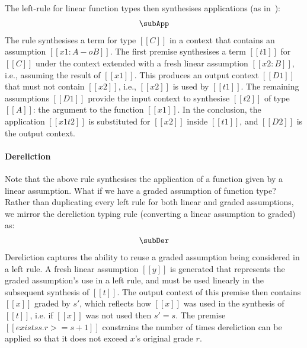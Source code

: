 The left-rule for linear function types then synthesises applications
(as in~\cite{HODAS1994327}):
%
  \begin{align*}
    \subApp
    \end{align*}
%
  The rule synthesises a term for type $[[ C ]]$ in a context that
  contains an assumption $[[ x1 : A -o B ]]$.
%
  The first premise synthesises a term $[[t1]]$ for $[[C]]$ under the context
  extended with a fresh linear assumption $[[x2
  : B]]$, i.e., assuming the result of $[[ x1 ]]$. This produces an output context $[[D1]]$ that must not contain
  $[[x2]]$, i.e., $[[x2]]$ is used by $[[t1]]$. The remaining
  assumptions $[[D1]]$ provide the input context to
  synthesise $[[t2]]$ of type $[[A]]$: the argument to the function $[[x1]]$. In the conclusion,
  the application $[[x1 t2]]$ is substituted for $[[x2]]$ inside
  $[[t1]]$, and $[[D2]]$ is the output context.

\paragraph{Dereliction} Note that the above rule synthesises the application of a
function given by a linear assumption. What if we have a graded
assumption of function type? Rather than duplicating every left rule
for both linear and graded assumptions, we mirror the
dereliction typing rule (converting a linear assumption to graded) as:
%
  \begin{align*}
    \subDer
    \end{align*}
%
  Dereliction captures the ability to reuse a graded assumption being
  considered in a left rule. A fresh linear assumption $[[y]]$ is generated that
  represents the graded assumption's use in a left rule, and must be used
  linearly in the subsequent synthesis of $[[t]]$. The output context of this premise then contains $[[x]]$ graded by $s'$, which reflects how $[[x]]$ was used in the synthesis of $[[t]]$, i.e. if $[[x]]$ was not used then $s' = s$. The premise $[[ exists s . r >= s + 1 ]]$ constrains the number of times dereliction can be applied so that it does not exceed $x$'s
  original grade $r$.

